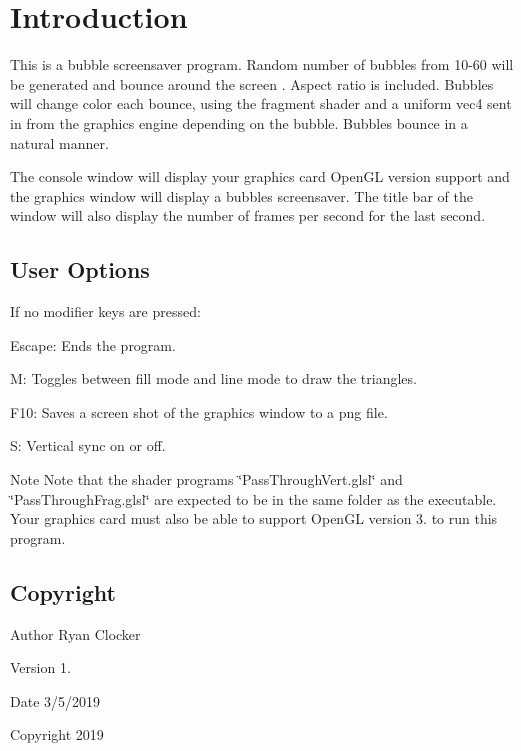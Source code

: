\hypertarget{index_intro}{}\section{Introduction}\label{index_intro}
This is a bubble screensaver program. Random number of bubbles from 10-\/60 will be generated and bounce around the screen . Aspect ratio is included. Bubbles will change color each bounce, using the fragment shader and a uniform vec4 sent in from the graphics engine depending on the bubble. Bubbles bounce in a natural manner.

The console window will display your graphics card Open\+GL version support and the graphics window will display a bubbles screensaver. The title bar of the window will also display the number of frames per second for the last second.\hypertarget{index_options}{}\subsection{User Options}\label{index_options}
If no modifier keys are pressed\+:


\begin{DoxyItemize}
\item Escape\+: Ends the program.
\item M\+: Toggles between fill mode and line mode to draw the triangles.
\item F10\+: Saves a screen shot of the graphics window to a png file.
\item S\+: Vertical sync on or off.
\end{DoxyItemize}

\begin{DoxyNote}{Note}
Note that the shader programs \char`\"{}\+Pass\+Through\+Vert.\+glsl\char`\"{} and \char`\"{}\+Pass\+Through\+Frag.\+glsl\char`\"{} are expected to be in the same folder as the executable. Your graphics card must also be able to support Open\+GL version 3. to run this program.
\end{DoxyNote}


\hypertarget{index_copyright}{}\subsection{Copyright}\label{index_copyright}
\begin{DoxyAuthor}{Author}
Ryan Clocker 
\end{DoxyAuthor}
\begin{DoxyVersion}{Version}
1. 
\end{DoxyVersion}
\begin{DoxyDate}{Date}
3/5/2019 
\end{DoxyDate}
\begin{DoxyCopyright}{Copyright}
2019
\end{DoxyCopyright}


